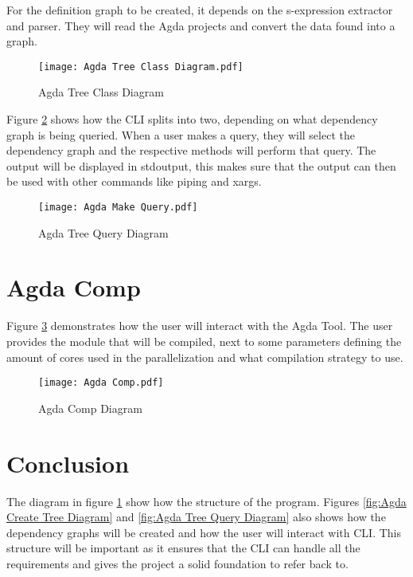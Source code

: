 For the definition graph to be created, it depends on the s-expression
extractor and parser. They will read the Agda projects and convert the data
found into a graph.

\begin{figure}[H]
    \centering
    \label{fig:Agda Tree Class Diagram}
    \texttt{[image: Agda Tree Class Diagram.pdf]}
    \caption{Agda Tree Class Diagram}
\end{figure} 
    
\pagebreak

Figure \ref{fig:Agda Tree Query Diagram} shows how the CLI splits into two,
depending on what dependency graph is being queried. When a user makes a query,
they will select the dependency graph and the respective methods will perform
that query. The output will be displayed in stdoutput, this makes sure that the
output can then be used with other commands like piping and xargs.

\begin{figure}[H]
    \centering
    \label{fig:Agda Tree Query Diagram}
    \texttt{[image: Agda Make Query.pdf]}
    \caption{Agda Tree Query Diagram}
\end{figure} 

\pagebreak 

\section{Agda Comp}


Figure \ref{fig:Agda Comp Diagram} demonstrates how the user will interact with
the Agda Tool. The user provides the module that will be compiled, next to some
parameters defining the amount of cores used in the parallelization and what
compilation strategy to use.
\begin{figure}[H]
    \centering 
    \label{fig:Agda Comp Diagram}
    \texttt{[image: Agda Comp.pdf]}
    \caption{Agda Comp Diagram}
\end{figure} 


\pagebreak

\section{Conclusion}

The diagram in figure \ref{fig:Agda Tree Class Diagram} show how the structure
of the program. Figures \ref{fig:Agda Create Tree Diagram} and \ref{fig:Agda
Tree Query Diagram} also shows how the dependency graphs will be created and
how the user will interact with CLI. This structure will be important as it
ensures that the CLI can handle all the requirements and gives the project a
solid foundation to refer back to. 

